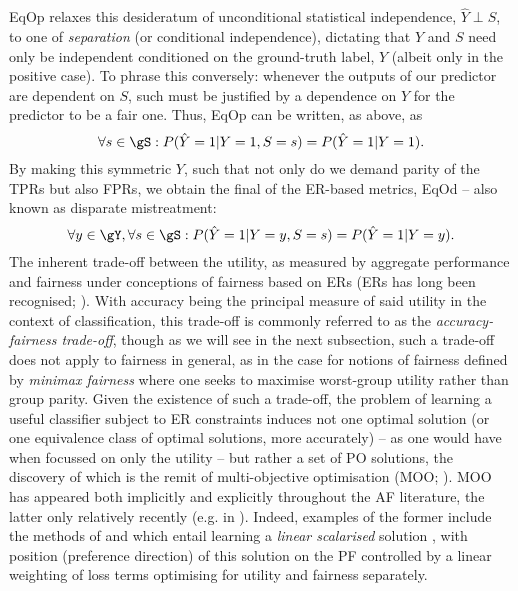 %
%
\Acf{EqOp} relaxes this desideratum of unconditional statistical independence, \(\hat{Y} \perp S\),
to one of \emph{separation} (or conditional independence), dictating that \(\hat{Y}\) and \(S\)
need only be independent conditioned on the ground-truth label, \(Y\) (albeit only in the positive
case).
%
To phrase this conversely: whenever the outputs of our predictor are dependent on \(S\), such must be
justified by a dependence on \(Y\) for the predictor to be a fair one.
%
Thus, \ac{EqOp} can be written, as above, as
%
\begin{equation}
    \forall s \in \gS: P( \hat{Y}=1|Y=1, S=s ) = P(\hat{Y}=1|Y=1).
\end{equation}
%
%
By making this symmetric \wrt{} \(Y\), such that not only do we demand parity of the \acp{TPR} but
also \acp{FPR}, we obtain the final of the \ac{ER}-based metrics, \ac{EqOd}
\citep{hardt2016equality} -- also known as disparate mistreatment:
%
\begin{equation}
    \forall y \in \gY, \forall s \in \gS: P( \hat{Y}=1|Y=y, S=s ) = P( \hat{Y}=1|Y=y ).
\end{equation}
%
%
The inherent trade-off between the utility, as measured by aggregate performance and fairness under
conceptions of fairness based on \aclp{ER} (\acsp{ER} has long been recognised;
\citealp{kaplow1999conflict}). 
%
With accuracy being the principal measure of said utility in the context of classification, this
trade-off is commonly referred to as the \emph{accuracy-fairness trade-off}, though as we will see
in the next subsection, such a trade-off does not apply to fairness in general, as in the case for
notions of fairness defined by \emph{minimax fairness} where one seeks to maximise worst-group
utility rather than group parity.
%
Given the existence of such a trade-off, the problem of learning a useful classifier subject to
\ac{ER} constraints induces not one optimal solution (or one equivalence class of optimal
solutions, more accurately) -- as one would have when focussed on only the utility -- but rather a
set of \ac{PO} solutions, the discovery of which is the remit of multi-objective optimisation
(\ac{MOO}; \citealp{sawaragi1985theory, deb2013multi}). 
%
\Ac{MOO} has appeared both implicitly and explicitly throughout the \ac{AF} literature, the latter
only relatively recently (e.g. in \citet{navon2020learning}). 
%
Indeed, examples of the former include the methods of \citet{louizos2015variational} and
\citet{madras2018learning} which entail learning a \emph{linear scalarised} solution
\citep{boyd2004convex},  with position (preference direction) of this solution on the \acf{PF}
controlled by a linear weighting of loss terms optimising for utility and fairness separately.
%
